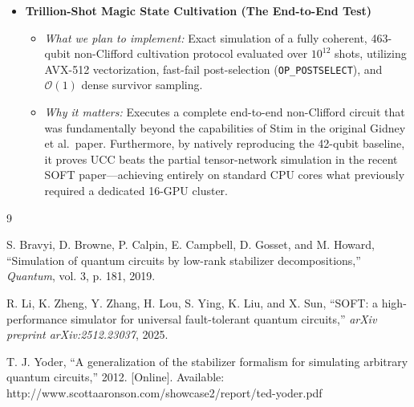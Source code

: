 \documentclass[11pt]{article}
\begin{document}
\begin{itemize}
    \item \textbf{Trillion-Shot Magic State Cultivation (The End-to-End Test)}
    \begin{itemize}
        \item \textit{What we plan to implement:} Exact simulation of a fully coherent, 463-qubit non-Clifford cultivation protocol evaluated over $10^{12}$ shots, utilizing AVX-512 vectorization, fast-fail post-selection (\texttt{OP\_POSTSELECT}), and $\mathcal{O}(1)$ dense survivor sampling.
        \item \textit{Why it matters:} Executes a complete end-to-end non-Clifford circuit that was fundamentally beyond the capabilities of Stim in the original Gidney et al.\ paper. Furthermore, by natively reproducing the 42-qubit baseline, it proves UCC beats the partial tensor-network simulation in the recent SOFT paper—achieving entirely on standard CPU cores what previously required a dedicated 16-GPU cluster.
    \end{itemize}
\end{itemize}


\begin{thebibliography}{9}

S. Bravyi, D. Browne, P. Calpin, E. Campbell, D. Gosset, and M. Howard,
``Simulation of quantum circuits by low-rank stabilizer decompositions,''
\textit{Quantum}, vol. 3, p. 181, 2019.

R. Li, K. Zheng, Y. Zhang, H. Lou, S. Ying, K. Liu, and X. Sun,
``SOFT: a high-performance simulator for universal fault-tolerant quantum circuits,''
\textit{arXiv preprint arXiv:2512.23037}, 2025.

T. J. Yoder,
``A generalization of the stabilizer formalism for simulating arbitrary quantum circuits,''
2012. [Online]. Available: http://www.scottaaronson.com/showcase2/report/ted-yoder.pdf

\end{thebibliography}
\end{document}
